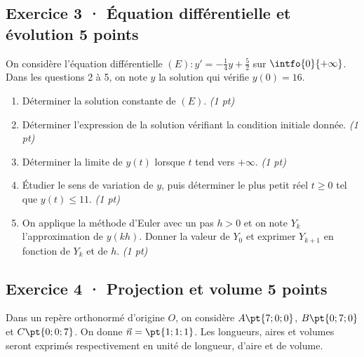 \mxnewpage{}

\subsection*{Exercice 3 · Équation différentielle et évolution \hfill 5 points}On considère l'équation différentielle $(E):y'=-\frac1{4}y+\frac{5}{2}$ sur $\intfo{0}{+\infty}$. Dans les questions 2 à 5, on note $y$ la solution qui vérifie $y(0)=16$.

\begin{enumerate}

\item Déterminer la solution constante de $(E)$. \hfill\textit{(1 pt)}

\item Déterminer l'expression de la solution vérifiant la condition initiale donnée. \hfill\textit{(1 pt)}

\item Déterminer la limite de $y(t)$ lorsque $t$ tend vers $+\infty$. \hfill\textit{(1 pt)}

\item Étudier le sens de variation de $y$, puis déterminer le plus petit réel $t\ge0$ tel que $y(t)\le11$. \hfill\textit{(1 pt)}

\item On applique la méthode d'Euler avec un pas $h>0$ et on note $Y_k$ l'approximation de $y(kh)$. Donner la valeur de $Y_0$ et exprimer $Y_{k+1}$ en fonction de $Y_k$ et de $h$. \hfill\textit{(1 pt)}

\end{enumerate}

\subsection*{Exercice 4 · Projection et volume \hfill 5 points}Dans un repère orthonormé d'origine $O$, on considère $A\pt{7;0;0}$, $B\pt{0;7;0}$ et $C\pt{0;0;7}$. On donne $\vec n=\pt{1;1;1}$. Les longueurs, aires et volumes seront exprimés respectivement en unité de longueur, d'aire et de volume.


